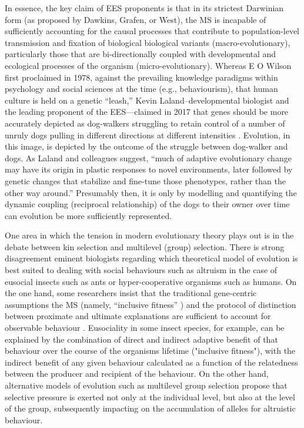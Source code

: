 In essence, the key claim of EES proponents is that in its strictest Darwinian form (as proposed by Dawkins, Grafen, or West), the MS is incapable of sufficiently accounting for the causal processes that contribute to population-level transmission and fixation of biological biological variants (macro-evolutionary), particularly those that are bi-directionally coupled with developmental and ecological processes of the organism  (micro-evolutionary).  Whereas E O Wilson first proclaimed in 1978, against the prevailing knowledge paradigms within psychology and social sciences at the time (e.g., behaviourism), that human culture is held on a genetic ``leash,'' Kevin Laland--developmental biologist and the leading proponent of the EES---claimed in 2017 that genes should be more accurately depicted as dog-walkers struggling to retain control of a number of unruly dogs pulling in different directions at different intensities \citep{West-Eberhard2003,Laland2017}.  Evolution, in this image, is depicted by the outcome of the struggle between dog-walker and dogs.  As Laland \citep[723][]{Laland2013} and colleagues suggest, ``much of adaptive evolutionary change may have its origin in plastic responses to novel environments, later followed by genetic changes that stabilize and fine-tune those phenotypes, rather than the other way around.''  Presumably then, it is only by modelling and quantifying the dynamic coupling (reciprocal relationship) of the dogs to their owner over time can evolution be more sufficiently represented.

One area in which the tension in modern evolutionary theory plays out is in the debate between kin selection and multilevel (group) selection. There is strong disagreement eminent biologists regarding which theoretical model of evolution is best suited to dealing with social behaviours such as altruism in the case of eusocial insects such as ants or hyper-cooperative organisms such as humans.  On the one hand, some researchers insist that the traditional gene-centric assumptions the MS (namely, ``inclusive fitness'' \citep[a.k.a. kin selection, see][]{Hamilton1964}) and the protocol of distinction between proximate and ultimate explanations are sufficient to account for observable behaviour \citep{Dawkins1982,Scott-Phillips2011,West2011}. Eusociality in some insect species, for example, can be explained by the combination of direct and indirect adaptive benefit of that behaviour over the course of the organisms lifetime ("inclusive fitness"), with the indirect benefit of any given behaviour calculated as a function of the relatedness between the producer and recipient of the behaviour.  On the other hand, alternative models of evolution such as multilevel group selection \citep{Nowak2006,Nowak2010} propose that selective pressure is exerted not only at the individual level, but also at the level of the group, subsequently impacting on the accumulation of alleles for altruistic behaviour.

